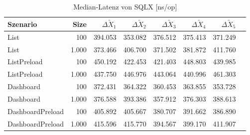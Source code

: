 
\begin{table}[ht]
\setlength{\extrarowheight}{-1pt}
\centering
\caption{Median-Latenz von SQLX [ns/op]}
\begin{tabular}{lrrrrrrr}
\toprule
Szenario & Size & ${\Delta \tilde{X}_1}$ & ${\Delta \tilde{X}_2}$ & ${\Delta \tilde{X}_3}$ & ${\Delta \tilde{X}_4}$ & ${\Delta \tilde{X}_5}$ \\
\midrule
	List & 100 & \cellcolor{red!21}  394.053 & \cellcolor{red!17}  353.082 & \cellcolor{red!16}  376.512 & \cellcolor{red!17}  375.413 & \cellcolor{red!16}  371.249 \\
	List & 1.000 & \cellcolor{red!16}  373.466 & \cellcolor{red!18}  406.700 & \cellcolor{red!16}  371.502 & \cellcolor{red!14}  381.872 & \cellcolor{red!18}  411.760 \\
	ListPreload & 100 & \cellcolor{red!36}  450.192 & \cellcolor{red!35}  422.453 & \cellcolor{red!36}  421.403 & \cellcolor{red!33}  448.803 & \cellcolor{red!32}  439.985 \\
	ListPreload & 1.000 & \cellcolor{red!30}  437.750 & \cellcolor{red!31}  446.976 & \cellcolor{red!35}  443.064 & \cellcolor{red!34}  440.996 & \cellcolor{red!30}  461.303 \\
	Dashboard & 100 & \cellcolor{red!17}  372.431 & \cellcolor{red!18}  364.322 & \cellcolor{red!16}  360.453 & \cellcolor{red!18}  363.855 & \cellcolor{red!15}  353.728 \\
	Dashboard & 1.000 & \cellcolor{red!14}  376.588 & \cellcolor{red!15}  393.386 & \cellcolor{red!14}  357.912 & \cellcolor{red!14}  376.303 & \cellcolor{red!11}  388.613 \\
	DashboardPreload & 100 & \cellcolor{red!26}  405.892 & \cellcolor{red!28}  405.667 & \cellcolor{red!21}  380.707 & \cellcolor{red!20}  391.662 & \cellcolor{red!21}  386.890 \\
	DashboardPreload & 1.000 & \cellcolor{red!23}  415.596 & \cellcolor{red!22}  415.770 & \cellcolor{red!23}  394.567 & \cellcolor{red!22}  399.170 & \cellcolor{red!19}  411.907 \\
\bottomrule
\end{tabular}
\label{tab:latenz_sqlx}
\end{table}
	